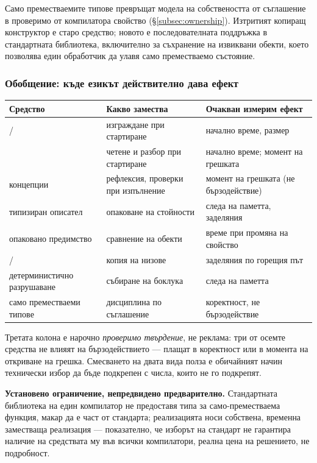 Само преместваемите типове превръщат модела на собствеността от съглашение в проверимо от
компилатора свойство (§\ref{subsec:ownership}). Изтритият копиращ конструктор е старо
средство; новото е последователната поддръжка в стандартната библиотека, включително за
съхранение на извиквани обекти, което позволява един обработчик да улавя само преместваемо
състояние.

\subsubsection{Обобщение: къде езикът действително дава ефект}

\begin{center}
\begin{tabular}{@{}L{4.5cm}L{4.2cm}L{5.1cm}@{}}
\textbf{Средство} & \textbf{Какво замества} & \textbf{Очакван измерим ефект} \\
\hline
{}/ & изграждане при стартиране & начално време, размер \\
 & четене и разбор при стартиране & начално време; момент на грешката \\
концепции & рефлексия, проверки при изпълнение & момент на грешката (не бързодействие) \\
типизиран описател & опаковане на стойности & следа на паметта, заделяния \\
опаковано предимство & сравнение на обекти & време при промяна на свойство \\
/ & копия на низове & заделяния по горещия път \\
детерминистично разрушаване & събиране на боклука & следа на паметта \\
само преместваеми типове & дисциплина по съглашение & коректност, не бързодействие \\
\end{tabular}
\end{center}

Третата колона е нарочно \emph{проверимо твърдение}, не реклама: три от осемте средства не
влияят на бързодействието --- плащат в коректност или в момента на откриване на грешка.
Смесването на двата вида полза е обичайният начин технически избор да бъде подкрепен с
числа, които не го подкрепят.

\textbf{Установено ограничение, непредвидено предварително.} Стандартната библиотека на
един компилатор не предоставя типа за само-преместваема функция, макар да е част от
стандарта; реализацията носи собствена, временна заместваща реализация --- показателно, че
изборът на стандарт не гарантира наличие на средствата му във всички компилатори, реална
цена на решението, не подробност.

